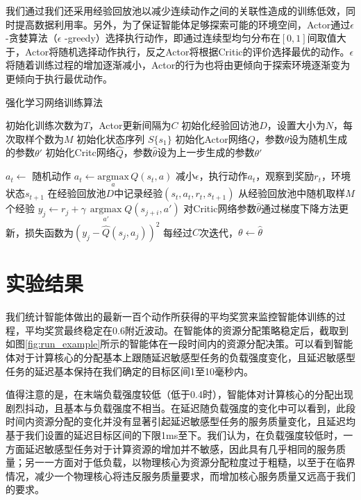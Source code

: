 我们通过我们还采用经验回放池以减少连续动作之间的关联性造成的训练低效，同时提高数据利用率。另外，为了保证智能体足够探索可能的环境空间，Actor通过$\epsilon$-贪婪算法（$\epsilon$ -greedy）选择执行动作\cite{sutton1998reinforcement}，即通过连续型均匀分布在$[0, 1]$间取值大于，Actor将随机选择动作执行，反之Actor将根据Critic的评价选择最优的动作。$\epsilon$将随着训练过程的增加逐渐减小，Actor的行为也将由更倾向于探索环境逐渐变为更倾向于执行最优动作。



\begin{algorithm}
\caption{强化学习网络训练算法}
\label{algo:merge_sort}
\begin{algorithmic} %
\State 初始化训练次数为$T$，Actor更新间隔为$C$
\State 初始化经验回访池$D$，设置大小为$N$，每次取样个数为$M$
\State 初始化状态序列 $S$\gets $\{s_1\}$
\State 初始化Actor网络$Q$，参数$\theta$设为随机生成的参数$\theta'$
\State 初始化Critc网络$\hat Q$，参数$\hat\theta$设为上一步生成的参数$\theta'$

 
\State	$a_t \gets $ 随机动作
\Else
\State	$a_t \gets \underset{a}{\mathrm{argmax}}\,Q(s_t,a)$
\EndIf
\State 减小$\epsilon$，执行动作$a_t$，观察到奖励$r_t$，环境状态$s_{t+1}$
\State 在经验回放池$D$中记录经验$(s_t, a_t, r_t, s_{t+1})$
\State 从经验回放池中随机取样$M$个经验
\State $y_j \gets r_j + \gamma\,\underset{a'}{\operatorname{argmax}}Q(s_{j+i}, a')$
\State 对Critic网络参数$\hat\theta$通过梯度下降方法更新，损失函数为$(y_j - \hat Q(s_j, a_j))^2$
\EndFor
\State 每经过$C$次迭代，$\theta \gets \hat\theta$
\EndFor

\end{algorithmic}
\end{algorithm}

\section{实验结果}
我们统计智能体做出的最新一百个动作所获得的平均奖赏来监控智能体训练的过程，平均奖赏最终稳定在0.6附近波动。在智能体的资源分配策略稳定后，截取到如图\ref{fig:run_example}所示的智能体在一段时间内的资源分配决策。可以看到智能体对于计算核心的分配基本上跟随延迟敏感型任务的负载强度变化，且延迟敏感型任务的延迟基本保持在我们确定的目标区间1至10毫秒内。

值得注意的是，在末端负载强度较低（低于0.4时），智能体对计算核心的分配出现剧烈抖动，且基本与负载强度不相当。在延迟随负载强度的变化中可以看到，此段时间内资源分配的变化并没有显著引起延迟敏感型任务的服务质量变化，且延迟均基于我们设置的延迟目标区间的下限1ms至下。我们认为，在负载强度较低时，一方面延迟敏感型任务对于计算资源的增加并不敏感，因此具有几乎相同的服务质量；另一一方面对于低负载，以物理核心为资源分配粒度过于粗糙，以至于在临界情况，减少一个物理核心将违反服务质量要求，而增加核心服务质量又远高于我们的要求。

